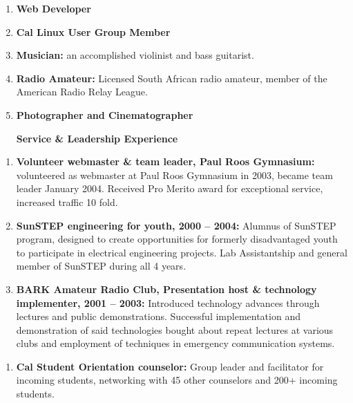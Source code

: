 \documentclass[12pt,twoside]{article}
\newcommand\liststyleWWviiiNumiii{%
\renewcommand\labelitemi{[F0A7?]}
\renewcommand\labelitemii{o}
\renewcommand\labelitemiii{[F0A7?]}
\renewcommand\labelitemiv{[F0B7?]}
}
\newcommand\liststyleWWviiiNumv{%
\renewcommand\labelitemi{[F0A7?]}
\renewcommand\labelitemii{o}
\renewcommand\labelitemiii{[F0A7?]}
\renewcommand\labelitemiv{[F0B7?]}
}
\newcommand\liststyleWWviiiNumix{%
\renewcommand\labelitemi{[F0A7?]}
\renewcommand\labelitemii{o}
\renewcommand\labelitemiii{[F0A7?]}
\renewcommand\labelitemiv{[F0B7?]}
}
\begin{document}
\liststyleWWviiiNumiii
\begin{enumerate}
\item {\sffamily\bfseries
Web Developer}
\item {\sffamily\bfseries
Cal Linux User Group Member}
\item {
\textsf{\textbf{Musician:}}\textsf{ an accomplished violinist and bass
guitarist.}}
\item {
\textsf{\textbf{Radio Amateur: }}\textsf{\textmd{Licensed South African
radio amateur, }}\textsf{member of the American Radio Relay League.}}
\item {\sffamily\bfseries
Photographer and Cinematographer}


\bigskip

{\sffamily\bfseries
Service \& Leadership Experience}
\end{enumerate}
\liststyleWWviiiNumv
\begin{enumerate}
\item {
\textsf{\textbf{Volunteer webmaster \& team leader, Paul Roos Gymnasium:
}}\textsf{volunteered as webmaster at Paul Roos Gymnasium in 2003,
became team leader January 2004. Received Pro Merito award for
exceptional service, increased traffic 10 fold.}}
\item {
\textsf{\textbf{SunSTEP engineering for youth, 2000 {--} 2004:}}\textsf{
Alumnus of SunSTEP program, designed to create opportunities for
formerly disadvantaged youth to participate in electrical engineering
projects. Lab Assistantship and general member of SunSTEP during all 4
years.}}
\item {
\textsf{\textbf{BARK Amateur Radio Club, Presentation host \& technology
implementer, 2001 {--} 2003:}}\textsf{ Introduced technology advances
through lectures and public demonstrations. Successful implementation
and demonstration of said technologies bought about repeat lectures at
various clubs and employment of techniques in emergency communication
systems.}}
\end{enumerate}
\liststyleWWviiiNumix
\begin{enumerate}
\item {
\textsf{\textbf{Cal Student Orientation counselor:}}\textsf{ Group
leader and facilitator for incoming students, networking with 45 other
counselors and 200+ incoming students.}}
\end{enumerate}
\end{document}
